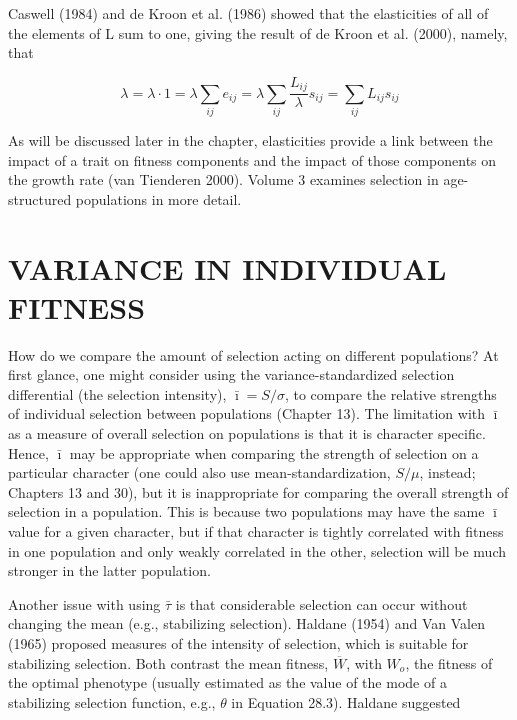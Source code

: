 \documentclass{article}
\begin{document}
Caswell (1984) and de Kroon et al. (1986) showed that the elasticities of all of the elements of L sum to one, giving the result of de Kroon et al. (2000), namely, that

\begin{equation}
\lambda=\lambda\cdot1=\lambda\sum_{ij}e_{ij}=\lambda\sum_{ij}\frac{L_{ij}}{\lambda}s_{ij}=\sum_{ij}L_{ij}s_{ij}
\tag{29.4d}
\label{eq:29_4d}
\end{equation}

As will be discussed later in the chapter, elasticities provide a link between the impact of a trait on fitness components and the impact of those components on the growth rate (van Tienderen 2000). Volume 3 examines selection in age-structured populations in more detail.

\section{VARIANCE IN INDIVIDUAL FITNESS}
How do we compare the amount of selection acting on different populations? At first glance, one might consider using the variance-standardized selection differential (the selection intensity),  $ \bar{\imath} = S/\sigma $, to compare the relative strengths of individual selection between populations (Chapter 13). The limitation with  $ \bar{\imath} $ as a measure of overall selection on populations is that it is character specific. Hence,  $ \bar{\imath} $ may be appropriate when comparing the strength of selection on a particular character (one could also use mean-standardization,  $ S/\mu $, instead; Chapters 13 and 30), but it is inappropriate for comparing the overall strength of selection in a population. This is because two populations may have the same  $ \bar{\imath} $ value for a given character, but if that character is tightly correlated with fitness in one population and only weakly correlated in the other, selection will be much stronger in the latter population.

Another issue with using  $ \bar{\tau} $ is that considerable selection can occur without changing the mean (e.g., stabilizing selection). Haldane (1954) and Van Valen (1965) proposed measures of the intensity of selection, which is suitable for stabilizing selection. Both contrast the mean fitness,  $ \overline{W} $, with  $ W_o $, the fitness of the optimal phenotype (usually estimated as the value of the mode of a stabilizing selection function, e.g.,  $ \theta $ in Equation 28.3). Haldane suggested
\end{document}
